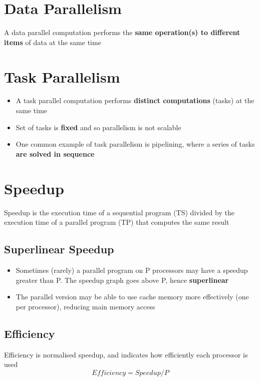 \documentclass{article}
\begin{document}
\tableofcontents

\newpage

\section{Data Parallelism}
\begin{flushleft}
A data parallel computation performs the\textbf{ same operation(s) to different items} of data at the same time
\end{flushleft}

\section{Task Parallelism}
\begin{itemize}
  \item A task parallel computation performs \textbf{distinct computations} (tasks) at the same time
  \item Set of tasks is \textbf{fixed} and so parallelism is not scalable
  \item One common example of task parallelism is pipelining, where a series of tasks \textbf{are solved in sequence}
\end{itemize}

\section{Speedup}
\begin{flushleft}
Speedup is the execution time of a sequential program (TS) divided by the execution time of a parallel program (TP) that computes the same result
\end{flushleft}

\subsection{Superlinear Speedup}
\begin{itemize}
  \item Sometimes (rarely) a parallel program on P processors may have a speedup greater than P. The speedup graph goes above P, hence \textbf{superlinear}
  \item The parallel version may be able to use cache memory more effectively (one per processor), reducing main memory access
\end{itemize}

\subsection{Efficiency}
\begin{flushleft}
Efficiency is normalised speedup, and indicates how efficiently each processor is used
\[ Efficiency = Speedup / P \]
\end{flushleft}
\end{document}
